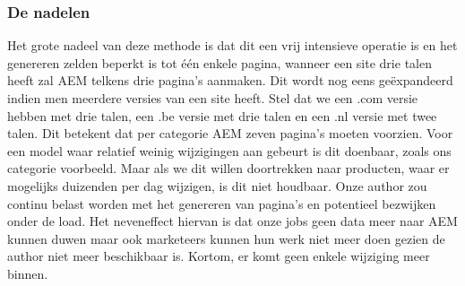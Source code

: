 	\subsubsection{De nadelen}
    Het grote nadeel van deze methode is dat dit een vrij intensieve operatie is en het genereren zelden beperkt is tot \'e\'en enkele pagina, wanneer een site drie talen heeft zal AEM telkens drie pagina's aanmaken. Dit wordt nog eens ge\"expandeerd indien men meerdere versies van een site heeft. Stel dat we een .com versie hebben met drie talen, een .be versie met drie talen en een .nl versie met twee talen. Dit betekent dat per categorie AEM zeven pagina's moeten voorzien. Voor een model waar relatief weinig wijzigingen aan gebeurt is dit doenbaar, zoals ons categorie voorbeeld. Maar als we dit willen doortrekken naar producten, waar er mogelijks duizenden per dag wijzigen, is dit niet houdbaar. Onze author zou continu belast worden met het genereren van pagina's en potentieel bezwijken onder de load. Het neveneffect hiervan is dat onze jobs geen data meer naar AEM kunnen duwen maar ook marketeers kunnen hun werk niet meer doen gezien de author niet meer beschikbaar is. Kortom, er komt geen enkele wijziging meer binnen.
